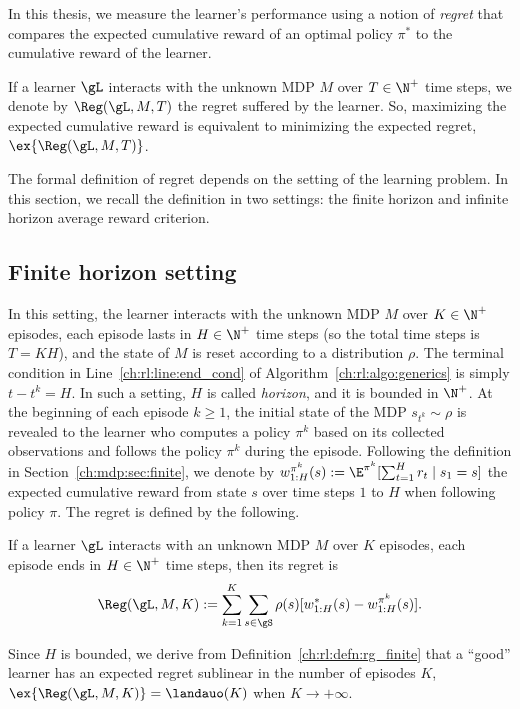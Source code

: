 In this thesis, we measure the learner's performance using a notion of \emph{regret} that compares the expected cumulative reward of an optimal policy $\pi^*$ to the cumulative reward of the learner. 

If a learner $\gL$ interacts with the unknown MDP $M$ over $T\in\N^+$ time steps, we denote by $\Reg(\gL, M, T)$ the regret suffered by the learner.
So, maximizing the expected cumulative reward is equivalent to minimizing the expected regret, $\ex{\Reg(\gL, M, T)}$.

The formal definition of regret depends on the setting of the learning problem.
In this section, we recall the definition in two settings: the finite horizon and infinite horizon average reward criterion.

\subsection{Finite horizon setting}
\label{ch:rl:ssec:finite}

In this setting, the learner interacts with the unknown MDP $M$ over $K\in\N^+$ episodes, each episode lasts in $H\in\N^+$ time steps (so the total time steps is $T=KH$), and the state of $M$ is reset according to a distribution $\rho$.
The terminal condition in Line~\ref{ch:rl:line:end_cond} of Algorithm~\ref{ch:rl:algo:generics} is simply $t-t^k=H$.
In such a setting, $H$ is called \emph{horizon}, and it is bounded in $\N^+$.
At the beginning of each episode $k\ge1$, the initial state of the MDP $s_{t^k}\sim\rho$ is revealed to the learner who computes a policy $\pi^k$ based on its collected observations and follows the policy $\pi^k$ during the episode.
Following the definition in Section~\ref{ch:mdp:sec:finite}, we denote by $w^{\pi^k}_{1:H}(s):=\E^{\pi^k}[\sum_{t=1}^{H}r_t \mid s_1=s]$ the expected cumulative reward from state $s$ over time steps $1$ to $H$ when following policy $\pi$.
The regret is defined by the following.
\begin{defn}
    \label{ch:rl:defn:rg_finite}
    If a learner $\gL$ interacts with an unknown MDP $M$ over $K$ episodes, each episode ends in $H\in\N^+$ time steps, then its regret is
    \begin{equation}
        \label{eq:rg_finite}
        \Reg(\gL, M, K):= \sum_{k=1}^K\sum_{s\in\gS}\rho(s)[w^*_{1:H}(s) -w^{\pi^k}_{1:H}(s)].
    \end{equation}
\end{defn}
Since $H$ is bounded, we derive from Definition~\ref{ch:rl:defn:rg_finite} that a ``good'' learner has an expected regret sublinear in the number of episodes $K$, $\ex{\Reg(\gL, M, K)}=\landauo(K)$ when $K\to+\infty$.

